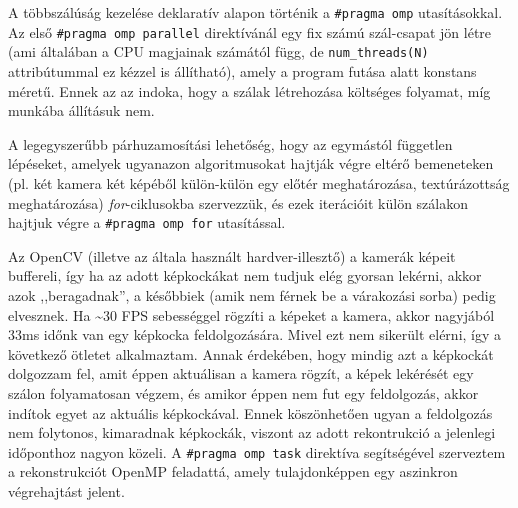 A többszálúság kezelése deklaratív alapon történik a \texttt{\#pragma omp} utasításokkal. Az első \texttt{\#pragma omp parallel} direktívánál egy fix számú szál-csapat jön létre (ami általában a CPU magjainak számától függ, de \texttt{num\_threads(N)} attribútummal ez kézzel is állítható), amely a program futása alatt konstans méretű. Ennek az az indoka, hogy a szálak létrehozása költséges folyamat, míg munkába állításuk nem.

A legegyszerűbb párhuzamosítási lehetőség, hogy az egymástól független lépéseket, amelyek ugyanazon algoritmusokat hajtják végre eltérő bemeneteken (pl. két kamera két képéből külön-külön egy előtér meghatározása, textúrázottság meghatározása) \textit{for}-ciklusokba szervezzük, és ezek iterációit külön szálakon hajtjuk végre a \texttt{\#pragma omp for} utasítással.

Az OpenCV (illetve az általa használt hardver-illesztő) a kamerák képeit buffereli, így ha az adott képkockákat nem tudjuk elég gyorsan lekérni, akkor azok ,,beragadnak'', a későbbiek (amik nem férnek be a várakozási sorba) pedig elvesznek. Ha \textasciitilde{}30 FPS sebességgel rögzíti a képeket a kamera, akkor nagyjából 33ms időnk van egy képkocka feldolgozására. Mivel ezt nem sikerült elérni, így a következő ötletet alkalmaztam. Annak érdekében, hogy mindig azt a képkockát dolgozzam fel, amit éppen aktuálisan a kamera rögzít, a képek lekérését egy szálon folyamatosan végzem, és amikor éppen nem fut egy feldolgozás, akkor indítok egyet az aktuális képkockával. Ennek köszönhetően ugyan a feldolgozás nem folytonos, kimaradnak képkockák, viszont az adott rekontrukció a jelenlegi időponthoz nagyon közeli. A \texttt{\#pragma omp task} direktíva segítségével szerveztem a rekonstrukciót OpenMP feladattá, amely tulajdonképpen egy aszinkron végrehajtást jelent.


